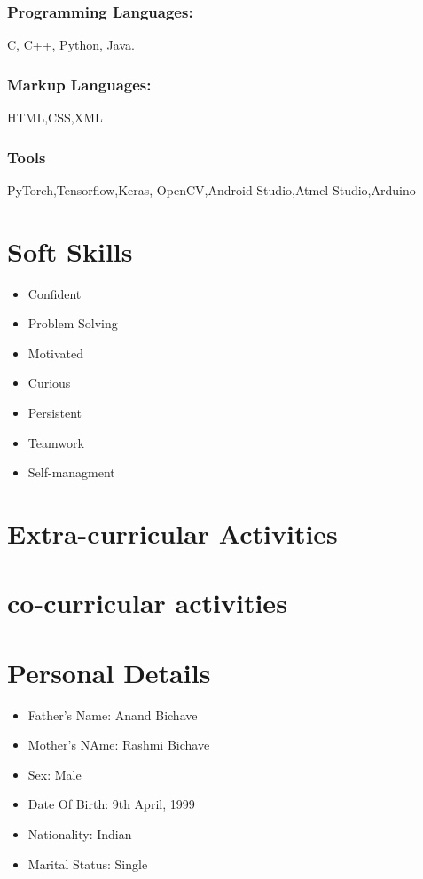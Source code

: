 \documentclass[10pt]{article}
\begin{document}
		\subsubsection{Programming Languages: }
			C, C++, Python, Java.
		\subsubsection{Markup Languages:}
			HTML,CSS,XML
		\subsubsection{Tools}
			PyTorch,Tensorflow,Keras, OpenCV,Android Studio,Atmel Studio,Arduino

\section{Soft Skills}
	\begin{multicols}{2}
	\begin{itemize}
	\item Confident \\
 	\item Problem Solving\\
	\item Motivated\\ 
	\item Curious\\
	\columnbreak
	\item Persistent \\
	\item Teamwork\\
	\item Self-managment\\
	\end{itemize}
	\end{multicols}


\section{Extra-curricular Activities}



\section{co-curricular activities}



\section{Personal Details} 
\begin{itemize}

\item{Father's Name: Anand Bichave}
\item{Mother's NAme: Rashmi Bichave}
\item{Sex: Male}
\item{Date Of Birth: 9th April, 1999}
\item{Nationality: Indian}
\item{Marital Status: Single}

\end{itemize}
\end{document}
